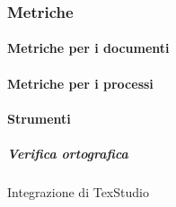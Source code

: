 		\subsubsection{Metriche}

			\paragraph{Metriche per i documenti}

			\paragraph{Metriche per i processi}



			\paragraph{Strumenti}


			\subparagraph{Verifica ortografica}
			Integrazione di TexStudio

